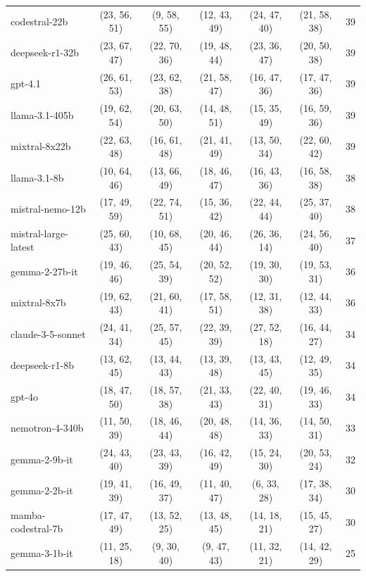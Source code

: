 \begin{table}[htbp]
{\begin{tabular}{lcccccc}
          codestral-22b & (23, 56, 51) & (9, 58, 55) & (12, 43, 49) & (24, 47, 40) & (21, 58, 38) & 39 \\
          deepseek-r1-32b & (23, 67, 47) & (22, 70, 36) & (19, 48, 44) & (23, 36, 47) & (20, 50, 38) & 39 \\
          gpt-4.1 & (26, 61, 53) & (23, 62, 38) & (21, 58, 47) & (16, 47, 36) & (17, 47, 36) & 39 \\
          llama-3.1-405b & (19, 62, 54) & (20, 63, 50) & (14, 48, 51) & (15, 35, 49) & (16, 59, 36) & 39 \\
          mixtral-8x22b & (22, 63, 48) & (16, 61, 48) & (21, 41, 49) & (13, 50, 34) & (22, 60, 42) & 39 \\
          llama-3.1-8b & (10, 64, 46) & (13, 66, 49) & (18, 46, 47) & (16, 43, 36) & (16, 58, 38) & 38 \\
          mistral-nemo-12b & (17, 49, 59) & (22, 74, 51) & (15, 36, 42) & (22, 44, 44) & (25, 37, 40) & 38 \\
          mistral-large-latest & (25, 60, 43) & (10, 68, 45) & (20, 46, 44) & (26, 36, 14) & (24, 56, 40) & 37 \\
          gemma-2-27b-it & (19, 46, 46) & (25, 54, 39) & (20, 52, 52) & (19, 30, 30) & (19, 53, 31) & 36 \\
          mixtral-8x7b & (19, 62, 43) & (21, 60, 41) & (17, 58, 51) & (12, 31, 38) & (12, 44, 33) & 36 \\
          claude-3-5-sonnet & (24, 41, 34) & (25, 57, 45) & (22, 39, 39) & (27, 52, 18) & (16, 44, 27) & 34 \\
          deepseek-r1-8b & (13, 62, 45) & (13, 44, 43) & (13, 39, 48) & (13, 43, 45) & (12, 49, 35) & 34 \\
          gpt-4o & (18, 47, 50) & (18, 57, 38) & (21, 33, 43) & (22, 40, 31) & (19, 46, 33) & 34 \\
          nemotron-4-340b & (11, 50, 39) & (18, 46, 44) & (20, 48, 48) & (14, 36, 33) & (14, 50, 31) & 33 \\
          gemma-2-9b-it & (24, 43, 40) & (23, 43, 39) & (16, 42, 49) & (15, 24, 30) & (20, 53, 24) & 32 \\
          gemma-2-2b-it & (19, 41, 39) & (16, 49, 37) & (11, 40, 47) & (6, 33, 28) & (17, 38, 34) & 30 \\
          mamba-codestral-7b & (17, 47, 49) & (13, 52, 25) & (13, 48, 45) & (14, 18, 21) & (15, 45, 27) & 30 \\
          gemma-3-1b-it & (11, 25, 18) & (9, 30, 40) & (9, 47, 43) & (11, 32, 21) & (14, 42, 29) & 25 \\

\end{tabular}}
\end{table}
